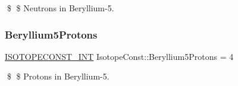 \$ \$ Neutrons in Beryllium-\/5. \mbox{\label{group___isotope_const-_beryllium-_be5_ga50c0298b5b1e90195055f0e5f4f02217}} 
\subsubsection{\texorpdfstring{Beryllium5\+Protons}{Beryllium5Protons}}
{\footnotesize\ttfamily \mbox{\hyperlink{group___isotope_const-_macros_ga5f18360b3e99483a35c32d789e62621c}{I\+S\+O\+T\+O\+P\+E\+C\+O\+N\+S\+T\+\_\+\+I\+NT}} Isotope\+Const\+::\+Beryllium5\+Protons = 4}

\$ \$ Protons in Beryllium-\/5. 
